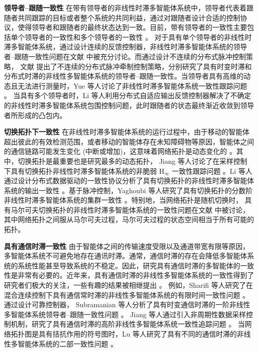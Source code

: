 \textbf{领导者--跟随一致性}  
在带有领导者的非线性时滞多智能体系统中，领导者代表着跟随者共同跟踪的目标或者整个系统的共同利益，通过对跟随者设计合适的控制协议，使得领导者和跟随者的最终状态达到一致。目前，带有领导者的一致性主要包括单个领导者的一致性和多个领导者的一致性 \cite{2015Event1998,2011Output200,2017A1625,2021Leader109444,wang2022leader127031,yue2019neuro230,li2021distributed109545,wen2020fault}。
对于具有单个领导者的非线性时滞多智能体系统，通过设计连续的反馈控制器，非线性时滞多智能体系统的领导者--跟随一致性问题在文献  \cite{2011Output200,2017A1625,2021Leader109444,wen2020fault} 中被充分讨论。而通过设计不连续的分布式脉冲控制策略，
文献 \cite{wang2022leader127031,wen2020fault} 提出了不连续的分布式脉冲牵制控制策略，分别研究了具有时变时滞和分布式时滞的非线性多智能体系统的领导者--跟随一致性。当领导者具有高维的动态且无法进行测量时，Yue 等人讨论了非线性时滞多智能体系统一致性跟踪问题 \cite{yue2019neuro230} 。
当具有多个领导者时，Li 等人利用分布式自适应输出反馈控制器解决了不确定的非线性时滞多智能体系统包围控制问题\cite{li2021distributed109545}，此时跟随者的状态最终渐近收敛到领导者所形成的凸包内。

\textbf{切换拓扑下一致性}  在非线性时滞多智能体系统的运行过程中，由于移动的智能体超出彼此的有效检测范围，或者移动的智能体存在未知障碍物等原因，智能体之间的通信链路可能发生变化 (中断或增加)，这意味着网络拓扑是动态变化的 \cite{jiang2020non210,li2018data1773,yaghoubi2020cluster1685,jiang2021h280,li2013second1595}。其中，切换拓扑是最重要也是研究最多的动态拓扑， Jiang 等人讨论了在采样控制下具有切换拓扑非线性时滞多智能体系统的非脆弱 H$_\infty$ 一致性跟踪问题 \cite{jiang2020non210} 。Li 等人  通过设计分布式数据驱动的一致性协议分析了具有切换拓扑的非线性时滞多智能体系统的输出一致性 \cite{li2018data1773}。基于脉冲控制，Yaghoubi 等人研究了具有切换拓扑的分数阶非线性时滞多智能体系统的集群一致性  \cite{yaghoubi2020cluster1685}。特别地，当网络拓扑是随机切换时， 具有马尔可夫切换拓扑的非线性时滞多智能体系统的一致性问题在文献 
\cite{jiang2021h280,li2013second1595} 中被讨论，其中网络拓扑之间服从马尔可夫过程，马尔可夫过程的状态空间相当于所有可能的拓扑。

 
\textbf{具有通信时滞一致性} 由于智能体之间的传输速度受限以及通道带宽有限等原因， 多智能体系统不可避免地存在通讯时滞。通常，通信时滞的存在会降低多智能体系统的系统性能甚至导致系统的不稳定。因此，研究具有通信时滞的多智能体的一致性是非常有必要的。近年来，具有通信时滞的非线性多智能体系统的一致性得到了研究者们极大的关注，一些有趣的结果被相继提出 \cite{sharifi2020finite10,2019Leader,2021Consensus126,lu2019consensus153,wang2016distributed918}。 例如，Sharifi 等人研究了在混合连续控制下具有通信常时滞的非线性多智能体系统的有限时间一致性问题   \cite{sharifi2020finite10}。通过设计可靠控制器， Subramanian 等人分析了具有时变通信时滞的一阶非线性多智能体系统领导者--跟随一致性问题  \cite{2019Leader}。
Jiang 等人通过引入非周期性数据采样控制机制，研究了具有通信时滞的高阶非线性多智能体系统一致性追踪问题 \cite{2021Consensus126}。 当网络拓扑图是具有拮抗作用的符号图时，Lu 等人研究了具有不同的通信时滞的非线性多智能体系统的二部一致性问题 \cite{lu2019consensus153,wang2016distributed918}。

